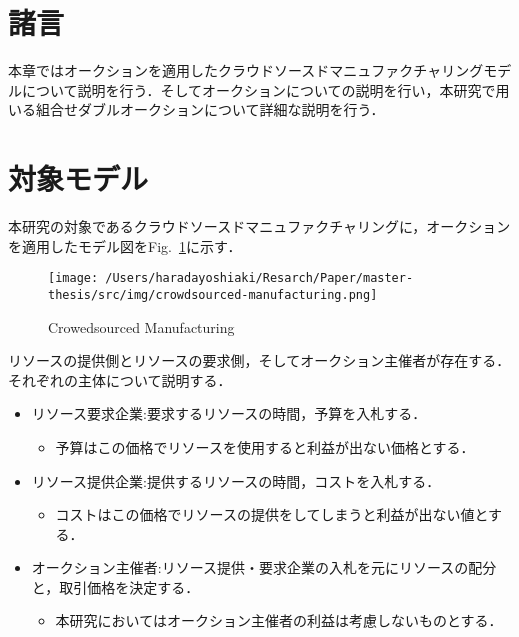 \hypertarget{ux8af8ux8a00}{%
\section{諸言　}\label{ux8af8ux8a00}}

本章ではオークションを適用したクラウドソースドマニュファクチャリングモデルについて説明を行う．そしてオークションについての説明を行い，本研究で用いる組合せダブルオークションについて詳細な説明を行う．

\hypertarget{ux5bfeux8c61ux30e2ux30c7ux30eb}{%
\section{対象モデル}\label{ux5bfeux8c61ux30e2ux30c7ux30eb}}

本研究の対象であるクラウドソースドマニュファクチャリングに，オークションを適用したモデル図をFig.~\ref{fig:csmfg}に示す．

\begin{figure}[H]
\hypertarget{fig:csmfg}{%
\centering
\texttt{[image: /Users/haradayoshiaki/Resarch/Paper/master-thesis/src/img/crowdsourced-manufacturing.png]}
\caption{Crowedsourced Manufacturing}\label{fig:csmfg}
}
\end{figure}

リソースの提供側とリソースの要求側，そしてオークション主催者が存在する．それぞれの主体について説明する．

\begin{itemize}
\tightlist
\item
  リソース要求企業:要求するリソースの時間，予算を入札する．

  \begin{itemize}
  \tightlist
  \item
    予算はこの価格でリソースを使用すると利益が出ない価格とする．
  \end{itemize}
\item
  リソース提供企業:提供するリソースの時間，コストを入札する．

  \begin{itemize}
  \tightlist
  \item
    コストはこの価格でリソースの提供をしてしまうと利益が出ない値とする．
  \end{itemize}
\item
  オークション主催者:リソース提供・要求企業の入札を元にリソースの配分と，取引価格を決定する．

  \begin{itemize}
  \tightlist
  \item
    本研究においてはオークション主催者の利益は考慮しないものとする．
  \end{itemize}
\end{itemize}

